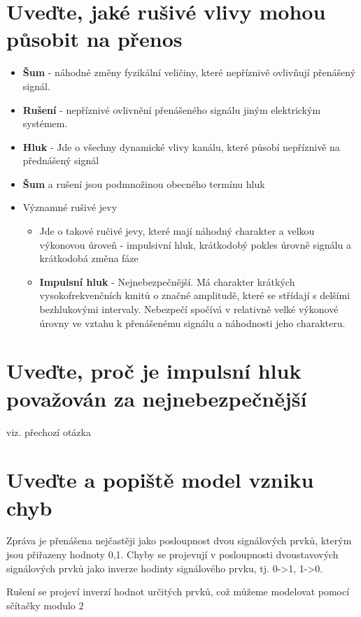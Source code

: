 \section{Uveďte, jaké rušivé vlivy mohou působit na přenos}
\begin{itemize}
    \item \textbf{Šum} - náhodné změny fyzikální veličiny, které nepříznivě ovlivňují přenášený signál.
    \item \textbf{Rušení} - nepříznivé ovlivnění přenášeného signálu jiným elektrickým systémem.
    \item \textbf{Hluk} - Jde o všechny dynamické vlivy kanálu, které působí nepříznivě na přednášený signál
    \item \textbf{Šum} a rušení jsou podmnožinou obecného termínu hluk
    \item Významné rušivé jevy
    \begin{itemize}
        \item Jde o takové ručivé jevy, které mají náhodný charakter a velkou výkonovou  úroveň - impulsivní hluk, krátkodobý pokles úrovně signálu a krátkodobá změna fáze
        \item \textbf{Impulsní hluk} - Nejnebezpečnější.
        Má charakter krátkých vysokofrekvenčních kmitů o značné amplitudě, které se střídají s delšími bezhlukovými intervaly. Nebezpečí spočívá v relativně velké výkonové úrovny ve vztahu k přenášenému signálu a náhodnosti jeho charakteru.
    \end{itemize}
\end{itemize}

\section{Uveďte, proč je impulsní hluk považován za nejnebezpečnější}
viz. přechozí otázka

\section{Uveďte a popiště model vzniku chyb}
Zpráva je přenášena nejčastěji jako posloupnost dvou signálových prvků, kterým jsou přiřazeny hodnoty 0,1.
Chyby se projevují v posloupnosti dvoustavových signálových prvků jako inverze hodinty signálového prvku, tj. 0->1, 1->0.

Rušení se projeví inverzí hodnot určitých prvků, což můžeme modelovat pomocí sčítačky modulo 2

